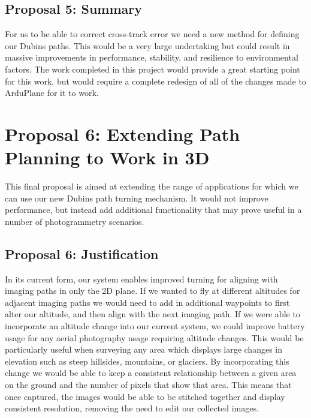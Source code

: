 \subsection{Proposal 5: Summary} 
\label{future:gustssummary}

For us to be able to correct cross-track error we need a new method for defining our Dubins paths. This would be a very large undertaking but could result in massive improvements in performance, stability, and resilience to environmental factors. The work completed in this project would provide a great starting point for this work, but would require a complete redesign of all of the changes made to ArduPlane for it to work.

\section{Proposal 6: Extending Path Planning to Work in 3D} 
\label{future:3d}

This final proposal is aimed at extending the range of applications for which we can use our new Dubins path turning mechanism. It would not improve performance, but instead add additional functionality that may prove useful in a number of photogrammetry scenarios.

\subsection{Proposal 6: Justification}
\label{future:3dreason}

In its current form, our system enables improved turning for aligning with imaging paths in only the 2D plane. If we wanted to fly at different altitudes for adjacent imaging paths we would need to add in additional waypoints to first alter our altitude, and then align with the next imaging path. If we were able to incorporate an altitude change into our current system, we could improve battery usage for any aerial photography usage requiring altitude changes. This would be particularly useful when surveying any area which displays large changes in elevation such as steep hillsides, mountains, or glaciers. By incorporating this change we would be able to keep a consistent relationship between a given area on the ground and the number of pixels that show that area. This means that once captured, the images would be able to be stitched together and display consistent resolution, removing the need to edit our collected images.

